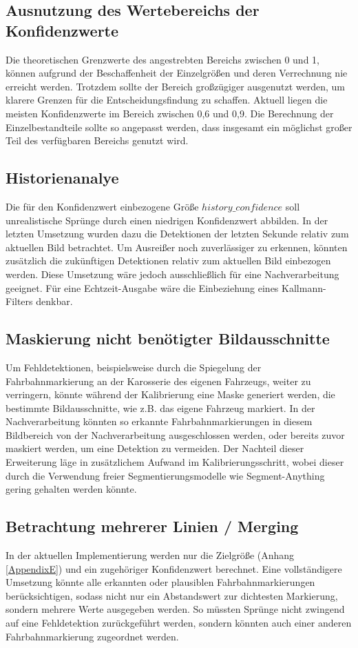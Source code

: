     \subsection{Ausnutzung des Wertebereichs der Konfidenzwerte}
    Die theoretischen Grenzwerte des angestrebten Bereichs zwischen 0 und 1, können aufgrund der Beschaffenheit der Einzelgrö{\ss}en und deren Verrechnung nie erreicht werden. Trotzdem sollte der Bereich gro{\ss}zügiger ausgenutzt werden, um klarere Grenzen für die Entscheidungsfindung zu schaffen. Aktuell liegen die meisten Konfidenzwerte im Bereich zwischen 0,6 und 0,9.
    Die Berechnung der Einzelbestandteile sollte so angepasst werden, dass insgesamt ein möglichst gro{\ss}er Teil des verfügbaren Bereichs genutzt wird.

    \subsection{Historienanalye}
    Die für den Konfidenzwert einbezogene Grö{\ss}e $history\_confidence$ soll unrealistische Sprünge durch einen niedrigen Konfidenzwert abbilden.
    In der letzten Umsetzung wurden dazu die Detektionen der letzten Sekunde relativ zum aktuellen Bild betrachtet.
    Um Ausrei{\ss}er noch zuverlässiger zu erkennen, könnten zusätzlich die zukünftigen Detektionen relativ zum aktuellen Bild einbezogen werden.
    Diese Umsetzung wäre jedoch ausschlie{\ss}lich für eine Nachverarbeitung geeignet. Für eine Echtzeit-Ausgabe wäre die Einbeziehung eines Kallmann-Filters denkbar.

    \subsection{Maskierung nicht benötigter Bildausschnitte}
    Um Fehldetektionen, beispielsweise durch die Spiegelung der Fahrbahnmarkierung an der Karosserie des eigenen Fahrzeugs, weiter zu verringern, könnte während der Kalibrierung eine Maske generiert werden, die bestimmte Bildausschnitte, wie z.B. das eigene Fahrzeug markiert.
    In der Nachverarbeitung könnten so erkannte Fahrbahnmarkierungen in diesem Bildbereich von der Nachverarbeitung ausgeschlossen werden, oder bereits zuvor maskiert werden, um eine Detektion zu vermeiden.
    Der Nachteil dieser Erweiterung läge in zusätzlichem Aufwand im Kalibrierungsschritt, wobei dieser durch die Verwendung freier Segmentierungsmodelle wie Segment-Anything gering gehalten werden könnte.

    \subsection{Betrachtung mehrerer Linien / Merging}
    In der aktuellen Implementierung werden nur die Zielgrö{\ss}e (Anhang \ref{AppendixE}) und ein zugehöriger Konfidenzwert berechnet. 
    Eine vollständigere Umsetzung könnte alle erkannten oder plausiblen Fahrbahnmarkierungen berücksichtigen, sodass nicht nur ein Abstandswert zur dichtesten Markierung, sondern mehrere Werte ausgegeben werden.
    So müssten Sprünge nicht zwingend auf eine Fehldetektion zurückgeführt werden, sondern könnten auch einer anderen Fahrbahnmarkierung zugeordnet werden.
    
